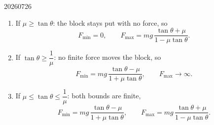\begin{solution}{20260726}
\begin{enumerate}
  \item If $\mu \ge \tan\theta$: the block stays put with no force, so
  \[
    \boxed{F_{\min} = 0},
    \qquad
    \boxed{F_{\max} = mg\,\frac{\tan\theta + \mu}{1 - \mu\tan\theta}} .
  \]
  \item If $\tan\theta \ge \dfrac{1}{\mu}$: no finite force moves the block, so
  \[
    \boxed{F_{\min} = mg\,\frac{\tan\theta - \mu}{1 + \mu\tan\theta}},
    \qquad
    \boxed{F_{\max} \to \infty} .
  \]
  \item If $\mu \le \tan\theta \le \dfrac{1}{\mu}$: both bounds are finite,
  \[
    \boxed{F_{\min} = mg\,\frac{\tan\theta - \mu}{1 + \mu\tan\theta}},
    \qquad
    \boxed{F_{\max} = mg\,\frac{\tan\theta + \mu}{1 - \mu\tan\theta}} .
  \]
\end{enumerate}

\end{solution}



